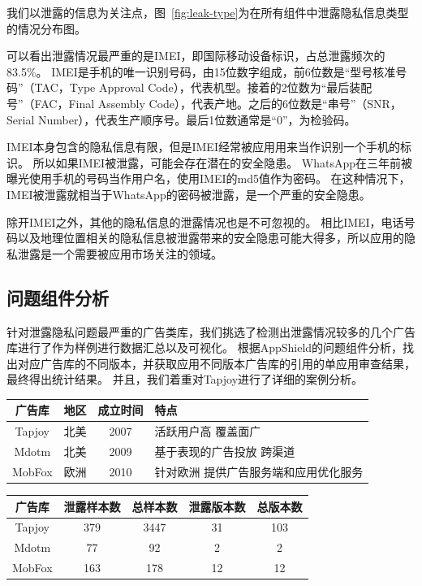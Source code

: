 我们以泄露的信息为关注点，图~\ref{fig:leak-type}为在所有组件中泄露隐私信息类型的情况分布图。

可以看出泄露情况最严重的是IMEI，即国际移动设备标识，占总泄露频次的83.5\%。
IMEI是手机的唯一识别号码，由15位数字组成，前6位数是“型号核准号码”（TAC，Type Approval Code），代表机型。接着的2位数为“最后装配号”（FAC，Final Assembly Code），代表产地。之后的6位数是“串号”（SNR，Serial Number），代表生产顺序号。最后1位数通常是“0”，为检验码。

IMEI本身包含的隐私信息有限，但是IMEI经常被应用用来当作识别一个手机的标识。
所以如果IMEI被泄露，可能会存在潜在的安全隐患。
WhatsApp在三年前被曝光使用手机的号码当作用户名，使用IMEI的md5值作为密码。
在这种情况下，IMEI被泄露就相当于WhatsApp的密码被泄露，是一个严重的安全隐患。

除开IMEI之外，其他的隐私信息的泄露情况也是不可忽视的。
相比IMEI，电话号码以及地理位置相关的隐私信息被泄露带来的安全隐患可能大得多，所以应用的隐私泄露是一个需要被应用市场关注的领域。

\subsection{问题组件分析}

针对泄露隐私问题最严重的广告类库，我们挑选了检测出泄露情况较多的几个广告库进行了作为样例进行数据汇总以及可视化。
根据AppShield的问题组件分析，找出对应广告库的不同版本，并获取应用不同版本广告库的引用的单应用审查结果，最终得出统计结果。
并且，我们着重对Tapjoy进行了详细的案例分析。

\begin{table}
	\centering
	\begin{tabularx}{\textwidth}{|c|c|c|X|}
		\hline
		广告库 & 地区 & 成立时间 & 特点\\
		\hline
		Tapjoy & 北美 & 2007 & 活跃用户高 覆盖面广\\
		\hline
		Mdotm & 北美 & 2009 & 基于表现的广告投放 跨渠道\\
		\hline
		MobFox & 欧洲 & 2010 & 针对欧洲 提供广告服务端和应用优化服务\\
		\hline
	\end{tabularx}
\end{table}

\begin{table}
	\centering
	\begin{tabular}{|c|c|c|c|c|}
		\hline
		广告库 & 泄露样本数 & 总样本数 & 泄露版本数 & 总版本数\\
		\hline
		Tapjoy & 379 & 3447 & 31 & 103\\
		\hline
		Mdotm & 77 & 92 & 2 & 2\\
		\hline
		MobFox & 163 & 178 & 12 & 12\\
		\hline
	\end{tabular}
\end{table}


